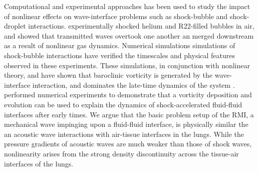 Computational and experimental approaches has been used to study the
impact of nonlinear effects on wave-interface problems such as
shock-bubble and shock-droplet interactions. \cite{Haast1987}
experimentally shocked helium and R22-filled bubbles in air, and
showed that transmitted waves overtook one another an merged
downstream as a result of nonlinear gas dynamics. Numerical
simulations simulations of shock-bubble interactions have verified the
timescales and physical features observed in these experiments. These
simulations, in conjunction with nonlinear theory, and have shown that
baroclinic vorticity is generated by the wave-interface interaction,
and dominates the late-time dynamics of the system
\citep{Picone1988,Quirk2006}. \cite{Hawley1989} performed numerical
experiments to demonstrate that a vorticity deposition and evolution
can be used to explain the dynamics of shock-accelerated fluid-fluid
interfaces after early times. We argue that the basic problem setup of
the \ac{RMI}, a mechanical wave impinging upon a fluid-fluid
interface, is physically similar the an acoustic wave interactions
with air-tissue interfaces in the lungs. While the pressure gradients
of acoustic waves are much weaker than those of shock waves,
nonlinearity arises from the strong density discontinuity across the
tissue-air interfaces of the lungs.

